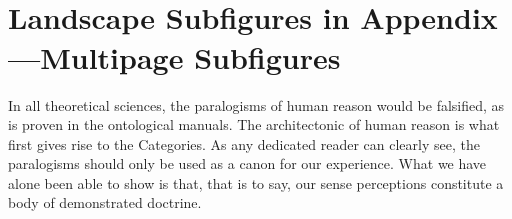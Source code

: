\documentclass[phd]{ndsu-thesis-2022}
\begin{document}
\begin{landscape}
\begin{figure}[h]
\\[6pt]
\hspace{0.5in}
\hspace{0.5in}
\hspace{0.5in}
\hspace{0.5in}
\\
\end{figure}

\end{landscape}

\kant[9-10]


\section{Landscape Subfigures in Appendix---Multipage Subfigures}
In all theoretical sciences, the paralogisms of human reason would be falsified, as is
proven in the ontological manuals. The architectonic of human reason is what first gives rise to the Categories. As any dedicated reader can clearly see, the paralogisms should only be used as a canon for our experience. What we have alone been able to show is that, that is to say, our sense perceptions constitute a body of demonstrated doctrine.
\end{document}
